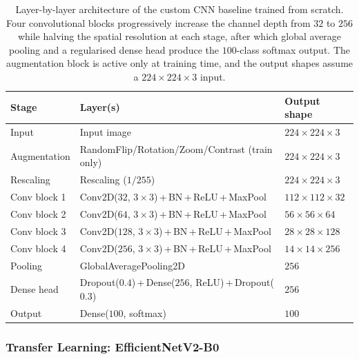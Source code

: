 \begin{table}[htbp]
\centering
\caption{Layer-by-layer architecture of the custom CNN baseline trained from scratch. Four convolutional blocks progressively increase the channel depth from $32$ to $256$ while halving the spatial resolution at each stage, after which global average pooling and a regularised dense head produce the $100$-class softmax output. The augmentation block is active only at training time, and the output shapes assume a $224\times224\times3$ input.}
\label{tab:customcnn}
\begin{tabular}{lll}
\toprule
\textbf{Stage} & \textbf{Layer(s)} & \textbf{Output shape} \\
\midrule
Input        & Input image                                       & $224\times224\times3$ \\
Augmentation & RandomFlip/Rotation/Zoom/Contrast (train only)    & $224\times224\times3$ \\
Rescaling    & Rescaling ($1/255$)                               & $224\times224\times3$ \\
Conv block 1 & Conv2D($32$, $3{\times}3$)\,+\,BN\,+\,ReLU\,+\,MaxPool  & $112\times112\times32$ \\
Conv block 2 & Conv2D($64$, $3{\times}3$)\,+\,BN\,+\,ReLU\,+\,MaxPool  & $56\times56\times64$ \\
Conv block 3 & Conv2D($128$, $3{\times}3$)\,+\,BN\,+\,ReLU\,+\,MaxPool & $28\times28\times128$ \\
Conv block 4 & Conv2D($256$, $3{\times}3$)\,+\,BN\,+\,ReLU\,+\,MaxPool & $14\times14\times256$ \\
Pooling      & GlobalAveragePooling2D                            & $256$ \\
Dense head   & Dropout($0.4$)\,+\,Dense($256$, ReLU)\,+\,Dropout($0.3$) & $256$ \\
Output       & Dense($100$, softmax)                             & $100$ \\
\bottomrule
\end{tabular}
\end{table}

\subsubsection{Transfer Learning: EfficientNetV2-B0}
\label{subsubsec:method-effnet}

